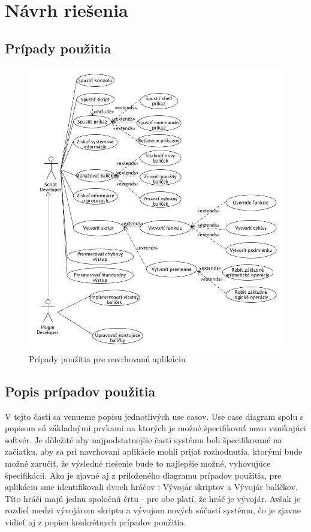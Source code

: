 \section{Návrh riešenia}
\subsection{Prípady použitia}
\begin{figure}[!htbp]
	\centering
	\includegraphics[width=\linewidth]{img/usecase.jpg}
	\caption{Prípady použitia pre navrhovanú aplikáciu}
	\label{fig:test}
\end{figure}
\newpage
\subsection{Popis prípadov použitia}
\indent V tejto časti sa venueme popisu jednotlivých use casov. Use case diagram spolu s popisom sú základnými prvkami na ktorých je možné špecifikovať novo vznikajúci softvér. Je dôležité aby najpodstatnejšie časti systému boli špecifikované na začiatku, aby sa pri navrhovaní aplikácie mohli prijať rozhodnutia, ktorými bude možné zaručiť, že výsledné riešenie bude to najlepšie možné, vyhovujúce špecifikácii. Ako je zjavné aj z priloženého diagramu prípadov použitia, pre aplikáciu sme identifikovali dvoch hráčov : Vývojár skriptov a Vývojár balíčkov. Títo hráči majú jednu spoločnú črtu - pre obe platí, že hráč je vývojár. Avšak je rozdiel medzi vývojárom skriptu a vývojom nových súčastí systému, čo je zjavne vidieť aj z popisu konkrétnych prípadov použitia.
